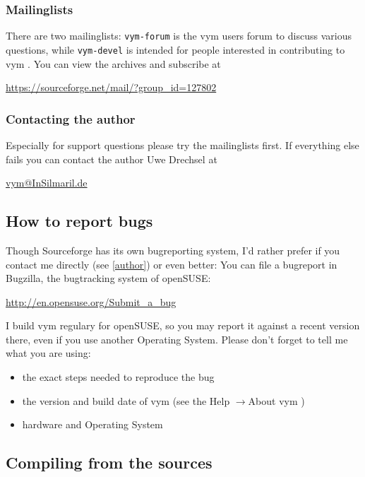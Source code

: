 \documentclass[12pt,a4paper]{article}
\newcommand{\vym}{{\sc vym }}
\newcommand{\ra}{$\longrightarrow$}
\begin{document}
\begin{appendix}
\subsubsection*{Mailinglists}
There are two mailinglists: {\tt vym-forum} is the \vym users forum to
discuss various questions, while {\tt vym-devel} is intended for people
interested in contributing to \vym. You can view the archives and
subscribe at
\begin{center}
\href{https://sourceforge.net/mail/?group_id=127802}{https://sourceforge.net/mail/?group\_id=127802}
\end{center}

\subsubsection*{Contacting the author}\label{author}
Especially for support questions please try the mailinglists first. If
everything else fails you can contact the author Uwe Drechsel at
\begin{center}
\href{mailto:vym@InSilmaril.de}{vym@InSilmaril.de}
\end{center}



\subsection{How to report bugs}
Though Sourceforge has its own bugreporting system, I'd rather prefer if
you contact me directly (see \ref{author}) or even better: You can file
a bugreport in Bugzilla, the bugtracking system of openSUSE:
\begin{center}
\href{http://en.opensuse.org/Submit_a_bug}{http://en.opensuse.org/Submit\_a\_bug}
\end{center}
I build \vym regulary for openSUSE, so you may report it against a
recent version there, even if you  use another Operating System.
Please don't forget to tell me what you are using:
\begin{itemize}
    \item the exact steps needed to reproduce the bug
    \item the version and build date of \vym (see the Help \ra About
    \vym)
    \item hardware and Operating System
\end{itemize}

\subsection{Compiling from the sources}

\end{appendix}
\end{document}
